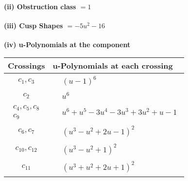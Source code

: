 \documentclass[1p]{elsarticle_modified}
\theoremstyle{definition}
\begin{document}
\flushleft \textbf{(ii) Obstruction class $= 1$}\\~\\
\flushleft \textbf{(iii) Cusp Shapes $= -5 u^2-16$}\\~\\
\newpage\renewcommand{\arraystretch}{1}
\flushleft \textbf{(iv) u-Polynomials at the component}\newline \\
\begin{tabular}{m{50pt}|m{274pt}}
Crossings & \hspace{64pt}u-Polynomials at each crossing \\
\hline $$\begin{aligned}c_{1},c_{3}\end{aligned}$$&$\begin{aligned}
&(u-1)^6
\end{aligned}$\\
\hline $$\begin{aligned}c_{2}\end{aligned}$$&$\begin{aligned}
&u^6
\end{aligned}$\\
\hline $$\begin{aligned}c_{4},c_{5},c_{8}\\c_{9}\end{aligned}$$&$\begin{aligned}
&u^6+u^5-3 u^4-3 u^3+3 u^2+u-1
\end{aligned}$\\
\hline $$\begin{aligned}c_{6},c_{7}\end{aligned}$$&$\begin{aligned}
&(u^3- u^2+2 u-1)^2
\end{aligned}$\\
\hline $$\begin{aligned}c_{10},c_{12}\end{aligned}$$&$\begin{aligned}
&(u^3- u^2+1)^2
\end{aligned}$\\
\hline $$\begin{aligned}c_{11}\end{aligned}$$&$\begin{aligned}
&(u^3+u^2+2 u+1)^2
\end{aligned}$\\
\hline
\end{tabular}\\~\\
\end{document}
